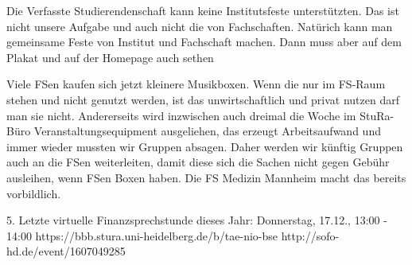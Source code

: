     Die Verfasste Studierendenschaft kann keine Institutsfeste unterstützten. Das ist nicht unsere Aufgabe und auch nicht die von Fachschaften. Natürich kann man gemeinsame Feste von Institut und Fachschaft machen. Dann muss aber auf dem Plakat und auf der Homepage auch sethen

    Viele FSen kaufen sich jetzt kleinere Musikboxen. Wenn die nur im FS-Raum stehen und nicht genutzt werden, ist das unwirtschaftlich und privat nutzen darf man sie nicht. Andererseits wird inzwischen auch dreimal die Woche im StuRa-Büro Veranstaltungsequipment ausgeliehen, das erzeugt Arbeitsaufwand und immer wieder mussten wir Gruppen absagen. Daher werden wir künftig Gruppen auch an die FSen weiterleiten, damit diese sich die Sachen nicht gegen Gebühr ausleihen, wenn FSen Boxen haben. Die FS Medizin Mannheim macht das bereits vorbildlich.


5. Letzte virtuelle Finanzsprechstunde dieses Jahr:
Donnerstag, 17.12., 13:00 - 14:00
https://bbb.stura.uni-heidelberg.de/b/tae-nio-bse
http://sofo-hd.de/event/1607049285

